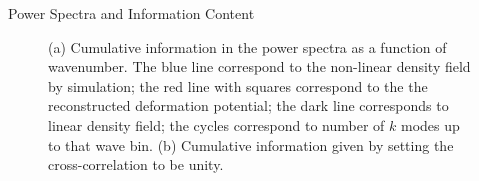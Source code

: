 \begin{section}{Power Spectra and Information Content}
\begin{figure}
\centering
   \caption{(a) Cumulative information in the power spectra as a function of wavenumber. The blue 
line correspond to the non-linear density field by simulation; the red line with squares correspond 
to the the reconstructed deformation potential; the dark line corresponds to linear density 
field; the cycles correspond to number of $k$ modes up to that wave bin. (b) Cumulative information 
given by setting the cross-correlation to be unity.}
  \label{fig:fisherinfo}

\end{figure}

\end{section}
